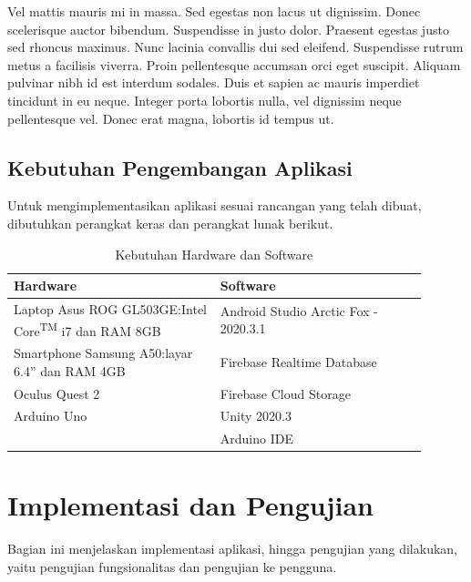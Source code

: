\documentclass[conference,a4paper,10pt]{IEEEtran}
\begin{document}
Vel mattis mauris mi in massa. Sed egestas non lacus ut dignissim. Donec
scelerisque auctor bibendum. Suspendisse in justo dolor. Praesent egestas justo
sed rhoncus maximus. Nunc lacinia convallis dui sed eleifend. Suspendisse rutrum
metus a facilisis viverra. Proin pellentesque accumsan orci eget suscipit.
Aliquam pulvinar nibh id est interdum sodales. Duis et sapien ac mauris imperdiet
tincidunt in eu neque. Integer porta lobortis nulla, vel dignissim neque
pellentesque vel. Donec erat magna, lobortis id tempus ut.

\subsection{Kebutuhan Pengembangan Aplikasi}
Untuk mengimplementasikan aplikasi sesuai rancangan yang telah dibuat, dibutuhkan
perangkat keras dan perangkat lunak berikut.

\begin{table}[H]
    \caption{Kebutuhan Hardware dan Software}
    \label{tab:kebutuhan}
    \centering
    \begin{tabular}{|p{0.45\linewidth}|p{0.45\linewidth}|}
        \hline
        \textbf{Hardware} & \textbf{Software} \\ \hline
        Laptop Asus ROG GL503GE:\newline Intel Core\textsuperscript{TM} i7 dan RAM 8GB
                          & Android Studio Arctic Fox - 2020.3.1 \\ \hline
        Smartphone Samsung A50:\newline layar 6.4'' dan RAM 4GB
                          & Firebase Realtime Database \\ \hline
        Oculus Quest 2     & Firebase Cloud Storage \\ \hline
        Arduino Uno        & Unity 2020.3 \\ \hline
                           & Arduino IDE \\ \hline
    \end{tabular}
\end{table}

\newpage
\section{Implementasi dan Pengujian}
Bagian ini menjelaskan implementasi aplikasi, hingga pengujian yang dilakukan,
yaitu pengujian fungsionalitas dan pengujian ke pengguna.
\end{document}
